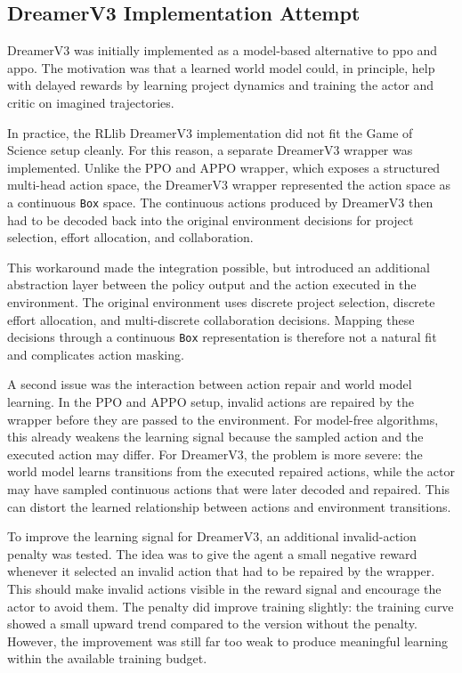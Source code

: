 \documentclass[english,bachelor]{hsluthesis}
\begin{document}
\subsection{DreamerV3 Implementation Attempt}
\label{subsec:dreamerV3}

DreamerV3 was initially implemented as a model-based alternative to \gls{ppo} and \gls{appo}. The motivation was that a learned world model could, in principle, help with delayed rewards by learning project dynamics and training the actor and critic on imagined trajectories.

In practice, the RLlib DreamerV3 implementation did not fit the Game of Science setup cleanly. For this reason, a separate DreamerV3 wrapper was implemented. Unlike the PPO and APPO wrapper, which exposes a structured multi-head action space, the DreamerV3 wrapper represented the action space as a continuous \texttt{Box} space. The continuous actions produced by DreamerV3 then had to be decoded back into the original environment decisions for project selection, effort allocation, and collaboration.

This workaround made the integration possible, but introduced an additional abstraction layer between the policy output and the action executed in the environment. The original environment uses discrete project selection, discrete effort allocation, and multi-discrete collaboration decisions. Mapping these decisions through a continuous \texttt{Box} representation is therefore not a natural fit and complicates action masking.

A second issue was the interaction between action repair and world model learning. In the PPO and APPO setup, invalid actions are repaired by the wrapper before they are passed to the environment. For model-free algorithms, this already weakens the learning signal because the sampled action and the executed action may differ. For DreamerV3, the problem is more severe: the world model learns transitions from the executed repaired actions, while the actor may have sampled continuous actions that were later decoded and repaired. This can distort the learned relationship between actions and environment transitions.

To improve the learning signal for DreamerV3, an additional invalid-action penalty was tested. The idea was to give the agent a small negative reward whenever it selected an invalid action that had to be repaired by the wrapper. This should make invalid actions visible in the reward signal and encourage the actor to avoid them. The penalty did improve training slightly: the training curve showed a small upward trend compared to the version without the penalty. However, the improvement was still far too weak to produce meaningful learning within the available training budget.
\end{document}
